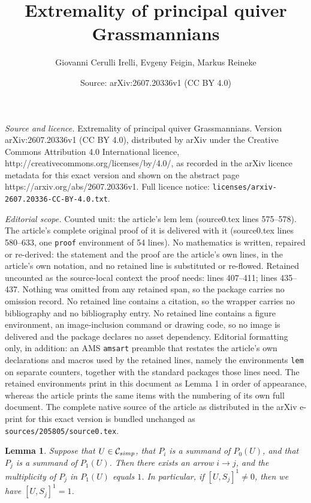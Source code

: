 \documentclass[10pt,a4paper]{amsart}
\title{Extremality of principal quiver Grassmannians}
\author{Giovanni Cerulli Irelli, Evgeny Feigin, Markus Reineke}
\date{Source: arXiv:2607.20336v1 (CC BY 4.0)}
\newtheorem{lem}{Lemma}
\begin{document}
\maketitle

\noindent\emph{Source and licence.} Extremality of principal quiver Grassmannians. Version arXiv:2607.20336v1 (CC BY 4.0), distributed by arXiv under the Creative Commons Attribution 4.0 International licence, http://creativecommons.org/licenses/by/4.0/, as recorded in the arXiv licence metadata for this exact version and shown on the abstract page https://arxiv.org/abs/2607.20336v1. Full licence notice: \texttt{licenses/arxiv-2607.20336-CC-BY-4.0.txt}.\par\smallskip

\noindent\textit{Editorial scope.} Counted unit: the article's lem lem (source0.tex lines 575--578). The article's complete original proof of it is delivered with it (source0.tex lines 580--633, one \texttt{proof} environment of 54 lines). No mathematics is written, repaired or re-derived: the statement and the proof are the article's own lines, in the article's own notation, and no retained line is substituted or re-flowed.  Retained uncounted as the source-local context the proof needs: lines 407--411; lines 435--437.  Nothing was omitted from any retained span, so the package carries no omission record.  No retained line contains a citation, so the wrapper carries no bibliography and no bibliography entry.  No retained line contains a figure environment, an image-inclusion command or drawing code, so no image is delivered and the package declares no asset dependency.  Editorial formatting only, in addition: an AMS \texttt{amsart} preamble that restates the article's own declarations and macros used by the retained lines, namely the environments \texttt{lem} on separate counters, together with the standard packages those lines need.  The retained environments print in this document as Lemma 1 in order of appearance, whereas the article prints the same items with the numbering of its own full document.  The complete native source of the article as distributed in the arXiv e-print for this exact version is bundled unchanged as \texttt{sources/205805/source0.tex}.
\begin{lem}\label{lemij} Suppose that $U\in\mathcal{C}_{\rm simp}$, that $P_i$ is a summand of 
$P_0(U)$, and that $P_j$ is a summand of $P_1(U)$. Then there exists an arrow $i\rightarrow j$, 
and the multiplicity of $P_j$ in $P_1(U)$ equals $1$. 
In particular, if $[U,S_j]^1\not=0$, then we have $[U,S_j]^1=1$.
\end{lem}
\end{document}
